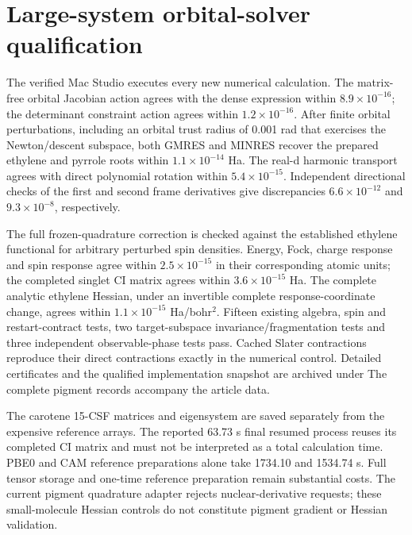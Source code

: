 \documentclass[11pt,a4paper]{article}
\begin{document}
\section{Large-system orbital-solver qualification}
The verified Mac Studio executes every new numerical calculation. The
matrix-free orbital Jacobian action agrees with the dense expression within
$8.9\times10^{-16}$; the determinant constraint action agrees within
$1.2\times10^{-16}$. After finite orbital perturbations, including an orbital trust radius of
0.001 rad that exercises the Newton/descent subspace, both GMRES and
MINRES recover the prepared ethylene and pyrrole roots within
$1.1\times10^{-14}$ Ha. The real-d harmonic transport agrees with direct
polynomial rotation within $5.4\times10^{-15}$. Independent directional
checks of the first and second frame derivatives give discrepancies
$6.6\times10^{-12}$ and $9.3\times10^{-8}$, respectively.

The full frozen-quadrature correction is checked against the established
ethylene functional for arbitrary perturbed spin densities. Energy, Fock,
charge response and spin response agree within $2.5\times10^{-15}$ in
their corresponding atomic units; the completed singlet CI matrix agrees
within $3.6\times10^{-15}$ Ha. The complete analytic ethylene Hessian,
under an invertible complete response-coordinate change, agrees within
$1.1\times10^{-15}$ Ha/bohr$^2$. Fifteen existing algebra, spin and
restart-contract tests, two target-subspace invariance/fragmentation
tests and three independent observable-phase tests pass. Cached Slater contractions reproduce their
direct contractions exactly in the numerical control. Detailed certificates
and the qualified implementation snapshot are archived under
The complete pigment records accompany the article data.

The carotene 15-CSF matrices and eigensystem are saved separately from
the expensive reference arrays. The reported 63.73 s final resumed process
reuses its completed CI matrix and must not be interpreted as a total
calculation time. PBE0 and CAM reference preparations alone take 1734.10
and 1534.74 s. Full tensor storage and one-time reference preparation
remain substantial costs. The current pigment quadrature adapter rejects
nuclear-derivative requests; these small-molecule Hessian controls do not
constitute pigment gradient or Hessian validation.
\end{document}
